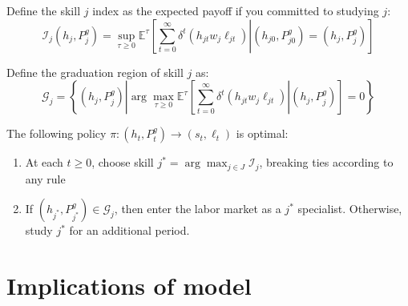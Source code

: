 \documentclass[10 pt]{article}
\newcommand{\sbr}[1]{\left[ #1 \right]}
\newcommand{\pr}[1]{\left( #1 \right)}
\newcommand{\ce}[2]{\left[\left. #1 \right\vert #2 \right]}
\begin{document}
Define the skill $j$ index as the expected payoff if you committed to studying $j$:
\begin{equation*}
\mathcal{I}_j (h_j, P_j^g) = \sup_{\tau \geq 0} \mathbb{E}^\tau
\ce{
   \sum_{t=0}^\infty \delta^t \pr{h_{jt} w_j \ell_{jt} }}
   {(h_{j0}, P_{j0}^g) = (h_j, P_j^g)
}
\end{equation*}

Define the graduation region of skill $j$ as: 
\begin{equation*}
\mathcal{G}_j = \left\{ (h_j, P_j^g) \left\vert
   \arg \max_{\tau \geq 0} 
   \mathbb{E}^\tau \ce{\sum_{t=0}^\infty \delta^t \pr{h_{jt} w_j \ell_{jt} }}
   {(h_j, P_j^g)} = 0
   \right. \right\}
\end{equation*}

The following policy $\pi: (h_t, P_t^g) \to (s_t, \ell_t)$ is optimal: 
\begin{enumerate}
    \item At each $t \geq 0$, choose skill $j^* = \arg \max_{j \in J} \mathcal{I}_j$, breaking ties according to any rule
    \item If $(h_{j^*}, P_{j^*}^g) \in \mathcal{G}_{j}$, then enter the labor market as a $j^*$ specialist. Otherwise, study $j^*$ for an additional period.  
\end{enumerate}

\section{Implications of model}




\printbibliography
\end{document}
